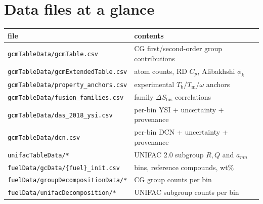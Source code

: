\documentclass[11pt]{article}
\newcommand{\Tb}{T_{\mathrm{b}}}
\newcommand{\Tm}{T_{\mathrm{m}}}
\begin{document}
\section*{Data files at a glance}
\begin{center}
\begin{tabular}{ll}
\toprule
file & contents \\
\midrule
\texttt{gcmTableData/gcmTable.csv} & CG first/second-order group contributions\\
\texttt{gcmTableData/gcmExtendedTable.csv} & atom counts, RD $C_p$, Alibakhshi $\phi_k$\\
\texttt{gcmTableData/property\_anchors.csv} & experimental $\Tb$/$\Tm$/$\omega$ anchors\\
\texttt{gcmTableData/fusion\_families.csv} & family $\Delta S_{\mathrm{fus}}$ correlations\\
\texttt{gcmTableData/das\_2018\_ysi.csv} & per-bin YSI + uncertainty + provenance\\
\texttt{gcmTableData/dcn.csv} & per-bin DCN + uncertainty + provenance\\
\texttt{unifacTableData/*} & UNIFAC 2.0 subgroup $R,Q$ and $a_{mn}$\\
\texttt{fuelData/gcData/\{fuel\}\_init.csv} & bins, reference compounds, wt\%\\
\texttt{fuelData/groupDecompositionData/*} & CG group counts per bin\\
\texttt{fuelData/unifacDecomposition/*} & UNIFAC subgroup counts per bin\\
\bottomrule
\end{tabular}
\end{center}
\end{document}
